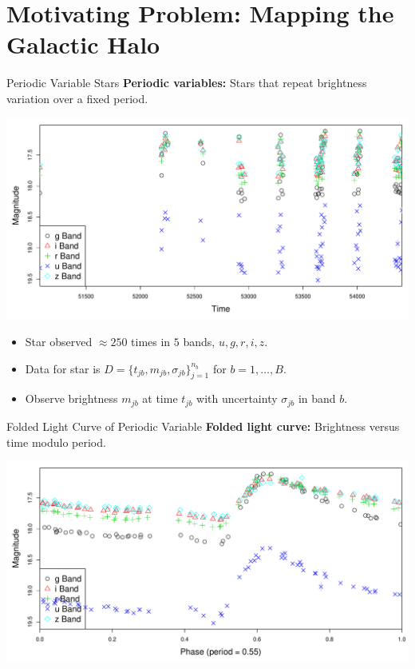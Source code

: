 \documentclass[12pt]{beamer}
\begin{document}



\section{Motivating Problem: Mapping the Galactic Halo}

\begin{frame}{Periodic Variable Stars}
\textbf{Periodic variables:} Stars that repeat brightness variation over a fixed period.
\begin{center}
\includegraphics[scale=.3]{figs/unfolded_13350.pdf}
\end{center}
\begin{itemize}
\item Star observed $\approx 250$ times in $5$ bands, $u,g,r,i,z$.
\item Data for star is $D=\{t_{jb},m_{jb},\sigma_{jb}\}_{j=1}^{n_b}$ for $b=1,\ldots,B$.
\item Observe brightness $m_{jb}$ at time $t_{jb}$ with uncertainty $\sigma_{jb}$ in band $b$.
\end{itemize}
\end{frame}


\begin{frame}{Folded Light Curve of Periodic Variable}
\textbf{Folded light curve:} Brightness versus time modulo period.
\begin{center}
\includegraphics[scale=.3]{figs/folded_13350.pdf}
\end{center}
\end{frame}
\end{document}
